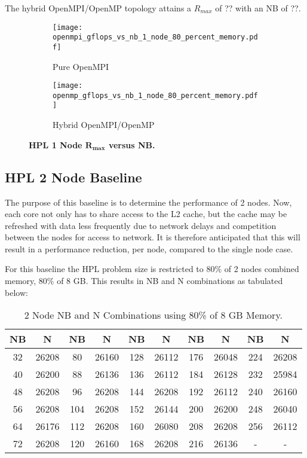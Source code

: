 The hybrid OpenMPI/OpenMP topology attains a $R_{max}$ of ?? with an NB of ??.

\begin{figure}[H]
	\begin{subfigure}{1.0\textwidth}
		\centering
		\texttt{[image: openmpi\_gflops\_vs\_nb\_1\_node\_80\_percent\_memory.pdf]}
		\caption{Pure OpenMPI}
		\label{fig:subim1}
	\end{subfigure}
	\par\bigskip
	\begin{subfigure}{1.0\textwidth}
		\centering
		\texttt{[image: openmp\_gflops\_vs\_nb\_1\_node\_80\_percent\_memory.pdf]}
		\caption{Hybrid OpenMPI/OpenMP}
		\label{fig:subim2}
	\end{subfigure}
\caption{\textbf{HPL 1 Node $\mathbf{R_{max}}$ versus NB.}}
\label{fig:image2}
\end{figure}


%
%
\subsection{HPL 2 Node Baseline}

The purpose of this baseline is to determine the performance of 2 nodes. Now, each core not only has to share access to the L2 cache, but the cache may be refreshed with data less frequently due to network delays and competition between the nodes for access to network. It is therefore anticipated that this will result in a performance reduction, per node, compared to the single node case.

For this baseline the HPL problem size is restricted to 80\% of 2 nodes combined memory, 80\% of 8 GB. This results in NB and N combinations as tabulated below:

\begin{table}[H]
\begin{center}
	\begin{tabular}{ |c|c|c|c|c|c|c|c|c|c| } 
		\hline
		NB & N & NB & N & NB & N & NB & N & NB & N \\ 
		\hline
		32 & 26208 &  80 & 26160 & 128 & 26112 & 176 & 26048 & 224 & 26208 \\ 
		40 & 26200 &  88 & 26136 & 136 & 26112 & 184 & 26128 & 232 & 25984 \\ 
 		48 & 26208 &  96 & 26208 & 144 & 26208 & 192 & 26112 & 240 & 26160 \\
		56 & 26208 & 104 & 26208 & 152 & 26144 & 200 & 26200 & 248 & 26040 \\ 
 		64 & 26176 & 112 & 26208 & 160 & 26080 & 208 & 26208 & 256 & 26112 \\
		72 & 26208 & 120 & 26160 & 168 & 26208 & 216 & 26136 &   - &     - \\ 
 		\hline
	\end{tabular}
\end{center}
\caption{\label{tab:table-name}2 Node NB and N Combinations using 80\% of 8 GB Memory.}
\end{table}



